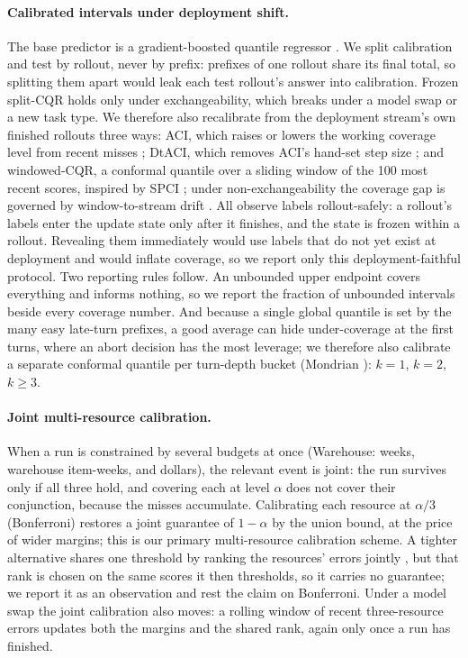 \documentclass{article}
\begin{document}
\paragraph{Calibrated intervals under deployment shift.} The base predictor is a
gradient-boosted quantile regressor \cite{ke2017lightgbm}. We split calibration and
test by rollout, never by prefix: prefixes of one rollout share its final total, so
splitting them apart would leak each test rollout's answer into calibration. Frozen
split-CQR holds only under exchangeability, which breaks under a model swap or a new
task type. We therefore also recalibrate from the deployment stream's own finished
rollouts three ways: ACI, which raises or lowers the working coverage level from recent
misses \cite{gibbs2021aci}; DtACI, which removes ACI's hand-set step size
\cite{gibbs2024dtaci}; and windowed-CQR, a conformal quantile over a sliding window of
the 100 most recent scores, inspired by SPCI \cite{xu2023spci}; under
non-exchangeability the coverage gap is governed by window-to-stream drift
\cite{barber2023beyond}. All observe labels rollout-safely: a rollout's labels enter
the update state only after it finishes, and the state is frozen within a rollout.
Revealing them immediately would use labels that do not yet exist at deployment and
would inflate coverage, so we report only this deployment-faithful protocol. Two
reporting rules follow. An unbounded upper endpoint covers everything and informs
nothing, so we report the fraction of unbounded intervals beside every coverage number.
And because a single global quantile is set by the many easy late-turn prefixes, a good
average can hide under-coverage at the first turns, where an abort decision has the
most leverage; we therefore also calibrate a separate conformal quantile per turn-depth
bucket (Mondrian \cite{vovk2012conditional}): $k{=}1$, $k{=}2$, $k{\geq}3$.

\paragraph{Joint multi-resource calibration.} When a run is constrained by several
budgets at once (Warehouse: weeks, warehouse item-weeks, and dollars), the relevant
event is joint: the run survives only if all three hold, and covering each at level
$\alpha$ does not cover their conjunction, because the misses accumulate. Calibrating
each resource at $\alpha/3$ (Bonferroni) restores a joint guarantee of $1{-}\alpha$ by
the union bound, at the price of wider margins; this is our primary multi-resource
calibration scheme. A tighter alternative shares one threshold by ranking the
resources' errors jointly \cite{messoudi2021copula}, but that rank is chosen on the
same scores it then thresholds, so it carries no guarantee; we report it as an
observation and rest the claim on Bonferroni. Under a model swap the joint calibration
also moves: a rolling window of recent three-resource errors updates both the margins
and the shared rank, again only once a run has finished.
\end{document}

